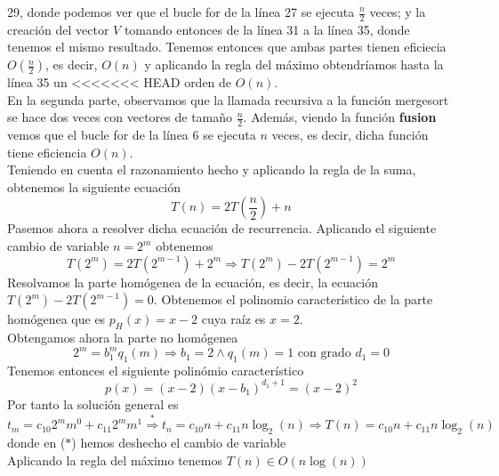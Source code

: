 \documentclass[11pt,openany]{book}
\begin{document}
        29, donde podemos ver que el bucle for de la línea 27 se ejecuta $\frac{n}{2}$ veces; y la creación del vector 
        $V$ tomando entonces de la línea 31 a la línea 35, donde tenemos el mismo resultado. Tenemos entonces que ambas partes 
        tienen eficiecia $O(\frac{n}{2})$, es decir, $O(n)$ y aplicando la regla del máximo obtendríamos hasta la línea 35 un
<<<<<<< HEAD
        orden de $O(n)$. \\
        En la segunda parte, observamos que la llamada recursiva a la función mergesort se hace dos veces con vectores de tamaño $\frac{n}{2}$.
        Además, viendo la función \textbf{fusion} vemos que el bucle for de la línea 6 se ejecuta $n$ veces, es decir, dicha función
        tiene eficiencia $O(n)$. \\
        Teniendo en cuenta el razonamiento hecho y aplicando la regla de la suma, obtenemos la siguiente ecuación
        \begin{equation*}
            T(n)=2T(\frac{n}{2})+n
        \end{equation*}
        Pasemos ahora a resolver dicha ecuación de recurrencia. Aplicando el siguiente cambio de variable $n=2^m$ obtenemos
        \begin{equation*}
            T(2^m)=2T(2^{m-1})+2^m \Longrightarrow T(2^m)-2T(2^{m-1})=2^m
        \end{equation*}
        Resolvamos la parte homógenea de la ecuación, es decir, la ecuación $T(2^m)-2T(2^{m-1})=0$. Obtenemos el polinomio
        característico de la parte homógenea que es $p_H(x)=x-2$ cuya raíz es $x=2$. \\
        Obtengamos ahora la parte no homógenea
        \begin{equation*}
            2^m=b_1^m q_1(m) \Longrightarrow b_1=2 \wedge q_1(m)=1 \text{ con grado } d_1=0
        \end{equation*}
        Tenemos entonces el siguiente polinómio característico
        \begin{equation*}
            p(x)=(x-2)(x-b_1)^{d_1+1}=(x-2)^2
        \end{equation*}
        Por tanto la solución general es
        \begin{equation*}
            t_m=c_{10}2^mm^0+c_{11}2^mm^1  \overset{*}{\Longrightarrow}  t_n=c_{10}n+c_{11}n\log_2(n) \Longrightarrow T(n)=c_{10}n+c_{11}n\log_2(n)
        \end{equation*}
        donde en ($*$) hemos deshecho el cambio de variable \\
        Aplicando la regla del máximo tenemos $T(n) \in O(n\log(n))$
\end{document}
